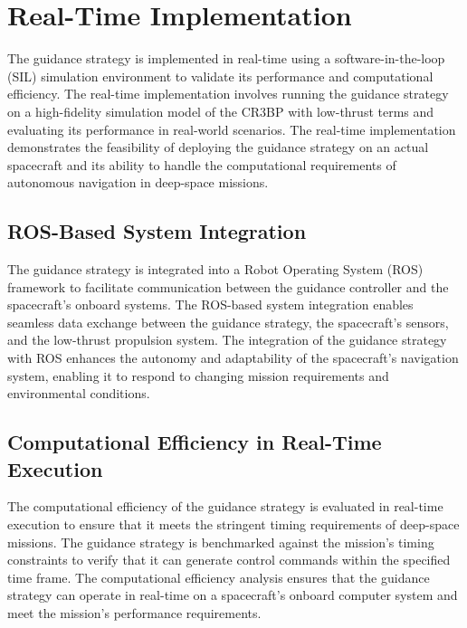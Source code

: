 \documentclass[conference]{IEEEtran}
\begin{document}
\section{Real-Time Implementation}
The guidance strategy is implemented in real-time using a software-in-the-loop (SIL) simulation environment to validate its performance and computational efficiency. The real-time implementation involves running the guidance strategy on a high-fidelity simulation model of the CR3BP with low-thrust terms and evaluating its performance in real-world scenarios. The real-time implementation demonstrates the feasibility of deploying the guidance strategy on an actual spacecraft and its ability to handle the computational requirements of autonomous navigation in deep-space missions.
\subsection{ROS-Based System Integration}
The guidance strategy is integrated into a Robot Operating System (ROS) framework to facilitate communication between the guidance controller and the spacecraft's onboard systems. The ROS-based system integration enables seamless data exchange between the guidance strategy, the spacecraft's sensors, and the low-thrust propulsion system. The integration of the guidance strategy with ROS enhances the autonomy and adaptability of the spacecraft's navigation system, enabling it to respond to changing mission requirements and environmental conditions.
\subsection{Computational Efficiency in Real-Time Execution}
The computational efficiency of the guidance strategy is evaluated in real-time execution to ensure that it meets the stringent timing requirements of deep-space missions. The guidance strategy is benchmarked against the mission's timing constraints to verify that it can generate control commands within the specified time frame. The computational efficiency analysis ensures that the guidance strategy can operate in real-time on a spacecraft's onboard computer system and meet the mission's performance requirements.
\end{document}
